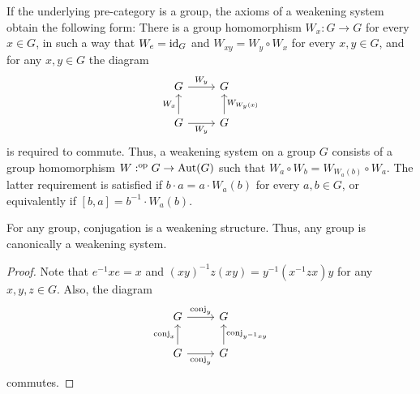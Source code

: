 \begin{eg}
If the underlying pre-category is a group, the axioms of a weakening system
obtain the following form: There is a group homomorphism $W_x:G\to G$ for
every $x\in G$, in such a way that $W_e={\mathrm{id}_{G}}$ and $W_{xy}=W_y\circ W_x$
for every $x,y\in G$, and for any $x,y\in G$ the diagram
\begin{equation*}
\begin{tikzcd}
G \arrow[r,"W_y"]
  &
G 
  \\
G \arrow[u,"W_x"]
  \arrow[r,swap,"W_y"]
  &
G \arrow[u,swap,"W_{W_y(x)}"]
\end{tikzcd}
\end{equation*}
is required to commute. Thus, a weakening system on a group $G$ consists of
a group homomorphism $W:^{\mathrm{op}} G\to\mathrm{Aut}(G)$ such that $W_a\circ W_b=
W_{W_a(b)}\circ W_a$. The latter requirement is satisfied if $b\cdot a=a\cdot W_a(b)$
for every $a,b\in G$, or equivalently if $[b,a]=b^{-1}\cdot W_a(b)$.
\end{eg}

\begin{lem}
For any group, conjugation is a weakening structure. Thus, any group is
canonically a weakening system.
\end{lem}

\begin{proof}
Note that $e^{-1}xe=x$ and $(xy)^{-1}z(xy)=y^{-1}(x^{-1}zx)y$ for any $x,y,z\in G$.
Also, the diagram
\begin{equation*}
\begin{tikzcd}
G \arrow[r,"\mathrm{conj}_y"]
  &
G 
  \\
G \arrow[u,"\mathrm{conj}_x"]
  \arrow[r,swap,"\mathrm{conj}_y"]
  &
G \arrow[u,swap,"\mathrm{conj}_{y^{-1}xy}"]
\end{tikzcd}
\end{equation*}
commutes.
\end{proof}

\begin{comment}
\begin{rmk}
Similarly, every groupoid has a canonical weakening structure given by
conjugation.
\end{rmk}
\end{comment}

